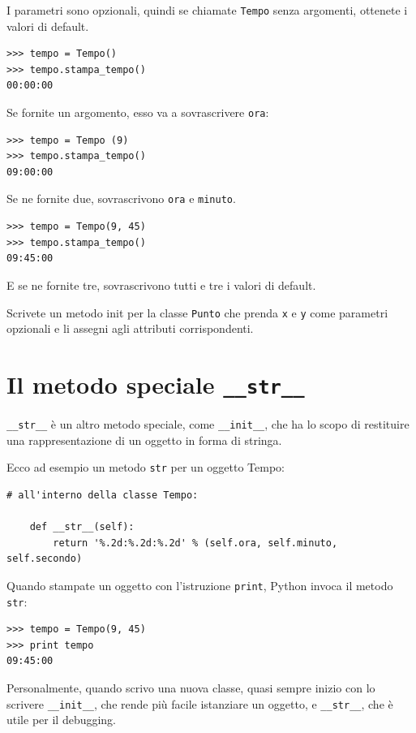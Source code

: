 \documentclass[10pt]{book}
\begin{document}
I parametri sono opzionali, quindi se chiamate {\tt Tempo} senza argomenti, ottenete i valori di default.

\begin{verbatim}
>>> tempo = Tempo()
>>> tempo.stampa_tempo()
00:00:00
\end{verbatim}
%
Se fornite un argomento, esso va a sovrascrivere {\tt ora}:

\begin{verbatim}
>>> tempo = Tempo (9)
>>> tempo.stampa_tempo()
09:00:00
\end{verbatim}
%
Se ne fornite due, sovrascrivono {\tt ora} e {\tt minuto}.

\begin{verbatim}
>>> tempo = Tempo(9, 45)
>>> tempo.stampa_tempo()
09:45:00
\end{verbatim}
%
E se ne fornite tre, sovrascrivono tutti e tre i valori di default.

\vspace{0.2in}
\begin{exercise}

Scrivete un metodo init per la classe {\tt Punto} che prenda {\tt x} e {\tt y} come parametri opzionali e li assegni agli attributi corrispondenti.
\end{exercise}


\section{Il metodo speciale {\tt \_\_str\_\_}}

\verb"__str__" è un altro metodo speciale, come \verb"__init__",
che ha lo scopo di restituire una rappresentazione di un oggetto in forma di stringa.

Ecco ad esempio un metodo {\tt str} per un oggetto Tempo:

\begin{verbatim}
# all'interno della classe Tempo:

    def __str__(self):
        return '%.2d:%.2d:%.2d' % (self.ora, self.minuto, self.secondo)
\end{verbatim}
%
Quando stampate un oggetto con l'istruzione {\tt print}, Python invoca il metodo {\tt str}:

\begin{verbatim}
>>> tempo = Tempo(9, 45)
>>> print tempo
09:45:00
\end{verbatim}
%
Personalmente, quando scrivo una nuova classe, quasi sempre inizio con lo scrivere \verb"__init__", che rende più facile istanziare un oggetto, e 
\verb"__str__", che è utile per il debugging.
\end{document}
